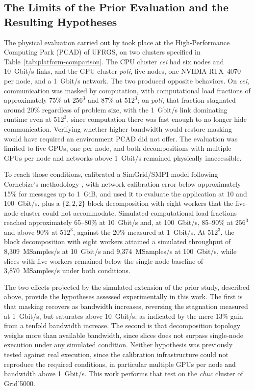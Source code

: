 \documentclass[12pt]{article}
\begin{document}
\subsection{The Limits of the Prior Evaluation and the Resulting Hypotheses}
The physical evaluation carried out by \cite{spadotto2026sbacpad} took place at the High-Performance Computing Park (PCAD) of UFRGS, on two clusters specified in Table~\ref{tab:platform-comparison}. The CPU cluster \textit{cei} had six nodes and 10~Gbit/s links, and the GPU cluster \textit{poti}, five nodes, one NVIDIA RTX~4070 per node, and a 1~Gbit/s network. The two produced opposite behaviors. On \textit{cei}, communication was masked by computation, with computational load fractions of approximately 75\% at $256^3$ and 87\% at $512^3$; on \textit{poti}, that fraction stagnated around 20\% regardless of problem size, with the 1~Gbit/s link dominating runtime even at $512^3$, since computation there was fast enough to no longer hide communication. Verifying whether higher bandwidth would restore masking would have required an environment PCAD did not offer. The evaluation was limited to five GPUs, one per node, and both decompositions with multiple GPUs per node and networks above 1~Gbit/s remained physically inaccessible.

To reach those conditions, \cite{spadotto2026carla} calibrated a SimGrid/SMPI model following Cornebize's methodology \cite{cornebize2021predictions}, with network calibration error below approximately 15\% for messages up to 1~GiB, and used it to evaluate the application at 10 and 100~Gbit/s, plus a $\{2,2,2\}$ block decomposition with eight workers that the five-node cluster could not accommodate. Simulated computational load fractions reached approximately 65--80\% at 10~Gbit/s and, at 100~Gbit/s, 85--90\% at $256^3$ and above 90\% at $512^3$, against the 20\% measured at 1~Gbit/s. At $512^3$, the block decomposition with eight workers attained a simulated throughput of 8,309~MSamples/s at 10~Gbit/s and 9,374~MSamples/s at 100~Gbit/s, while slices with five workers remained below the single-node baseline of 3,870~MSamples/s under both conditions.



The two effects projected by the simulated extension of the prior study, described above, provide the hypotheses assessed experimentally in this work. The first is that masking recovers as bandwidth increases, reversing the stagnation measured at 1~Gbit/s, but saturates above 10~Gbit/s, as indicated by the mere 13\% gain from a tenfold bandwidth increase. The second is that decomposition topology weighs more than available bandwidth, since slices does not surpass single-node execution under any simulated condition. Neither hypothesis was previously tested against real execution, since the calibration infrastructure could not reproduce the required conditions, in particular multiple GPUs per node and bandwidth above 1~Gbit/s. This work performs that test on the \textit{chuc} cluster of Grid'5000.
\end{document}
